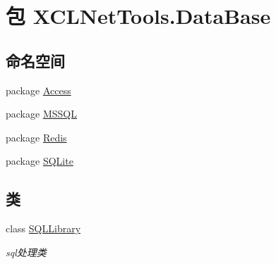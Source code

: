 \hypertarget{namespace_x_c_l_net_tools_1_1_data_base}{\section{包 X\-C\-L\-Net\-Tools.\-Data\-Base}
\label{namespace_x_c_l_net_tools_1_1_data_base}
}
\subsection*{命名空间}
\begin{DoxyCompactItemize}
\item 
package \hyperlink{namespace_x_c_l_net_tools_1_1_data_base_1_1_access}{Access}
\item 
package \hyperlink{namespace_x_c_l_net_tools_1_1_data_base_1_1_m_s_s_q_l}{M\-S\-S\-Q\-L}
\item 
package \hyperlink{namespace_x_c_l_net_tools_1_1_data_base_1_1_redis}{Redis}
\item 
package \hyperlink{namespace_x_c_l_net_tools_1_1_data_base_1_1_s_q_lite}{S\-Q\-Lite}
\end{DoxyCompactItemize}
\subsection*{类}
\begin{DoxyCompactItemize}
\item 
class \hyperlink{class_x_c_l_net_tools_1_1_data_base_1_1_s_q_l_library}{S\-Q\-L\-Library}
\begin{DoxyCompactList}\small\item\em sql处理类 \end{DoxyCompactList}\end{DoxyCompactItemize}
